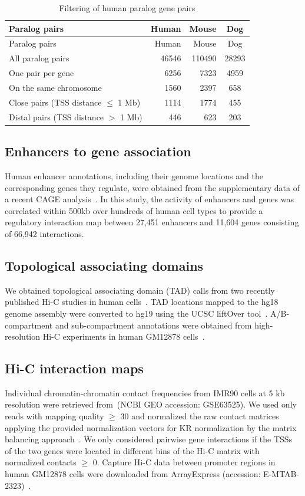 \documentclass[a4paper,twoside=true,openright,parskip=full,chapterprefix=true,11pt,headings=normal,bibliography=totoc,listof=totoc,titlepage=on,captions=tableabove,draft=false]{scrreprt}
\theoremstyle{definition}
\theoremstyle{definition}
\theoremstyle{definition}
\theoremstyle{remark}
\begin{document}
\begin{longtable}[]{@{}lrrc@{}}
\caption{\label{tab:filter} Filtering of human paralog gene
pairs}\tabularnewline
\toprule
Paralog pairs & Human & Mouse & Dog\tabularnewline
\midrule
\endfirsthead
\toprule
Paralog pairs & Human & Mouse & Dog\tabularnewline
\midrule
\endhead
All paralog pairs & 46546 & 110490 & 28293\tabularnewline
One pair per gene & 6256 & 7323 & 4959\tabularnewline
On the same chromosome & 1560 & 2397 & 658\tabularnewline
Close pairs (TSS distance \(\leq\) 1 Mb) & 1114 & 1774 &
455\tabularnewline
Distal pairs (TSS distance \(>\) 1 Mb) & 446 & 623 & 203\tabularnewline
\bottomrule
\end{longtable}

\subsection{Enhancers to gene
association}\label{enhancers-to-gene-association}

Human enhancer annotations, including their genome locations and the
corresponding genes they regulate, were obtained from the supplementary
data of a recent CAGE analysis~\citep{Andersson2014}. In this study, the
activity of enhancers and genes was correlated within 500kb over
hundreds of human cell types to provide a regulatory interaction map
between 27,451 enhancers and 11,604 genes consisting of 66,942
interactions.

\subsection{Topological associating
domains}\label{topological-associating-domains}

We obtained topological associating domain (TAD) calls from two recently
published Hi-C studies in human cells~\citep{Dixon2012, Rao2014}. TAD
locations mapped to the hg18 genome assembly were converted to hg19
using the UCSC liftOver tool~\citep{Hinrichs2006}. A/B-compartment and
sub-compartment annotations were obtained from high-resolution Hi-C
experiments in human GM12878 cells~\citep{Rao2014}.

\subsection{Hi-C interaction maps}\label{hi-c-interaction-maps}

Individual chromatin-chromatin contact frequencies from IMR90 cells at 5
kb resolution were retrieved from~\citep{Rao2014}(NCBI GEO accession:
GSE63525). We used only reads with mapping quality \(\geq\) 30 and
normalized the raw contact matrices applying the provided normalization
vectors for KR normalization by the matrix balancing
approach~\citep{Knight2013}. We only considered pairwise gene
interactions if the TSSs of the two genes were located in different bins
of the Hi-C matrix with normalized contacts \(\geq\) 0. Capture Hi-C
data between promoter regions in human GM12878 cells were downloaded
from ArrayExpress (accession: E-MTAB-2323)~\citep{Mifsud2015}.
\end{document}
